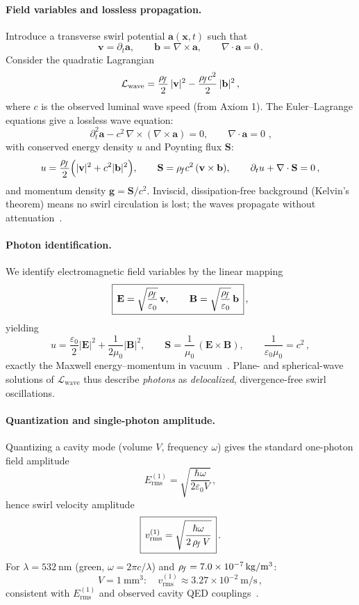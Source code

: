 \documentclass[11pt]{article}
\begin{document}
\paragraph{Field variables and lossless propagation.}
    Introduce a transverse swirl potential $\mathbf{a}(\mathbf{x},t)$ such that
    \[
        \mathbf{v} = \partial_t \mathbf{a}, \qquad
        \mathbf{b} = \nabla\times \mathbf{a}, \qquad \nabla\cdot \mathbf{a}=0\,.
    \]
    Consider the quadratic Lagrangian
    \[
        \mathcal{L}_{\text{wave}} = \frac{\rho_{\!f}}{2}\,|\mathbf{v}|^2 - \frac{\rho_{\!f} c^2}{2}\,|\mathbf{b}|^2\,,
    \]
    where $c$ is the observed luminal wave speed (from Axiom 1). The Euler–Lagrange equations give a lossless wave equation:
    \[
        \boxed{\,\partial_t^2 \mathbf{a} - c^2\,\nabla\times(\nabla\times \mathbf{a}) = 0, \qquad \nabla\cdot \mathbf{a}=0\,}\,,
    \]
    with conserved energy density $u$ and Poynting flux $\mathbf{S}$:
    \[
        u = \frac{\rho_{\!f}}{2}\Big(|\mathbf{v}|^2 + c^2|\mathbf{b}|^2\Big), \qquad
        \mathbf{S} = \rho_{\!f} c^2\,(\mathbf{v}\times \mathbf{b}), \qquad
        \partial_t u + \nabla\cdot \mathbf{S}=0\,,
    \]
    and momentum density $\mathbf{g}=\mathbf{S}/c^2$. Inviscid, dissipation-free background (Kelvin’s theorem) means no swirl circulation is lost; the waves propagate without attenuation~\cite{Batchelor1967,Saffman1992}.

\paragraph{Photon identification.}
    We identify electromagnetic field variables by the linear mapping
    \[
        \boxed{\,\mathbf{E} = \sqrt{\frac{\rho_{\!f}}{\varepsilon_0}}\,\mathbf{v}, \qquad
        \mathbf{B} = \sqrt{\frac{\rho_{\!f}}{\varepsilon_0}}\,\mathbf{b}\,}\,,
    \]
    yielding
    \[
        u = \frac{\varepsilon_0}{2}|\mathbf{E}|^2 + \frac{1}{2\mu_0}|\mathbf{B}|^2, \qquad
        \mathbf{S} = \frac{1}{\mu_0}\,(\mathbf{E}\times \mathbf{B}), \qquad
        \frac{1}{\varepsilon_0 \mu_0} = c^2\,,
    \]
    exactly the Maxwell energy–momentum in vacuum~\cite{Jackson1999}. Plane- and spherical-wave solutions of $\mathcal{L}_{\text{wave}}$ thus describe \emph{photons} as \emph{delocalized}, divergence-free swirl oscillations.

\paragraph{Quantization and single-photon amplitude.}
    Quantizing a cavity mode (volume $V$, frequency $\omega$) gives the standard one-photon field amplitude
    \[
        E_{\text{rms}}^{(1)} = \sqrt{\frac{\hbar\omega}{2\varepsilon_0 V}}\,,
    \]
    hence swirl velocity amplitude
    \[
        \boxed{\,v_{\text{rms}}^{(1)} = \sqrt{\frac{\hbar\omega}{2\,\rho_{\!f}\,V}}\,}\,.
    \]
    For $\lambda = 532~\mathrm{nm}$ (green, $\omega=2\pi c/\lambda$) and $\rho_{\!f}=7.0\times10^{-7}\,\mathrm{kg/m^3}$:
    \[
        V=1~\mathrm{mm}^3: \quad v_{\text{rms}}^{(1)} \approx 3.27\times10^{-2}\ \mathrm{m/s}\,,
    \]
    consistent with $E_{\text{rms}}^{(1)}$ and observed cavity QED couplings~\cite{HarocheRaimond2006,ScullyZubairy1997}.
\end{document}
